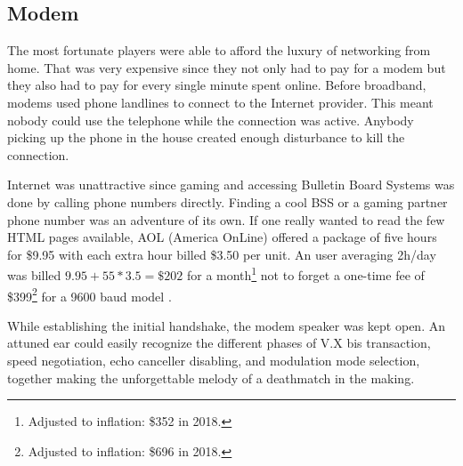 \subsection{Modem}
The most fortunate players were able to afford the luxury of networking from home. That was very expensive since they not only had to pay for a modem but they also had to pay for every single minute spent online. Before broadband, modems used phone landlines to connect to the Internet provider. This meant nobody could use the telephone while the connection was active. Anybody picking up the phone in the house created enough disturbance to kill the connection.\\
\par
Internet was unattractive since gaming and accessing Bulletin Board Systems was done by calling phone numbers directly. Finding a cool BSS or a gaming partner phone number was an adventure of its own. If one really wanted to read the few HTML pages available, AOL (America OnLine) offered a package of five hours for \$9.95 with each extra hour billed \$3.50 per unit. An user averaging 2h/day was billed $9.95 + 55 * 3.5 = \$202 $ for a month\footnote{Adjusted to inflation: \$352 in 2018.} not to forget a one-time fee of \$399\footnote{Adjusted to inflation: \$696 in 2018.} for a 9600 baud model .\\
\par
{}

 While establishing the initial handshake, the modem speaker was kept open. An attuned ear could easily recognize the different phases of V.X bis transaction, speed negotiation, echo canceller disabling, and modulation mode selection, together making the unforgettable melody of a deathmatch in the making.\\
 \par 
{}
\par
 
